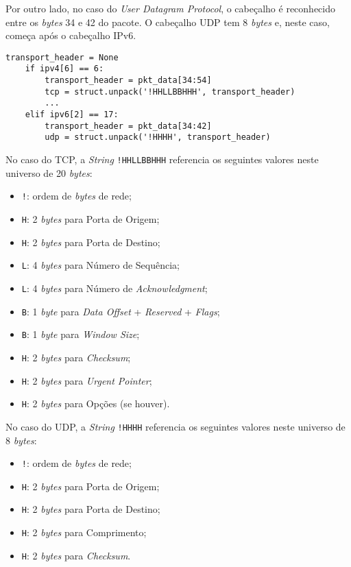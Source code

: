 \documentclass[12pt]{article}
\begin{document}
\quad Por outro lado, no caso do \emph{User Datagram Protocol}, o cabeçalho é reconhecido entre os \emph{bytes} 34 e 42 do pacote. O cabeçalho UDP tem 8 \emph{bytes} e, neste caso, começa após o cabeçalho IPv6.

\begin{lstlisting}[style=vscode]
transport_header = None
    if ipv4[6] == 6:
        transport_header = pkt_data[34:54]
        tcp = struct.unpack('!HHLLBBHHH', transport_header)
        ...
    elif ipv6[2] == 17:
        transport_header = pkt_data[34:42]
        udp = struct.unpack('!HHHH', transport_header)
\end{lstlisting}

\quad No caso do TCP, a \emph{String} \texttt{!HHLLBBHHH} referencia os seguintes valores neste universo de 20 \emph{bytes}:

\begin{itemize}
    \item \texttt{!}: ordem de \emph{bytes} de rede;
    \item \texttt{H}: 2 \emph{bytes} para Porta de Origem;
    \item \texttt{H}: 2 \emph{bytes} para Porta de Destino;
    \item \texttt{L}: 4 \emph{bytes} para Número de Sequência;
    \item \texttt{L}: 4 \emph{bytes} para Número de \emph{Acknowledgment};
    \item \texttt{B}: 1 \emph{byte} para \emph{Data Offset} + \emph{Reserved} + \emph{Flags};
    \item \texttt{B}: 1 \emph{byte} para \emph{Window Size};
    \item \texttt{H}: 2 \emph{bytes} para \emph{Checksum};
    \item \texttt{H}: 2 \emph{bytes} para \emph{Urgent Pointer};
    \item \texttt{H}: 2 \emph{bytes} para Opções (se houver).
\end{itemize}

\quad No caso do UDP, a \emph{String} \texttt{!HHHH} referencia os seguintes valores neste universo de 8 \emph{bytes}:

\begin{itemize}
    \item \texttt{!}: ordem de \emph{bytes} de rede;
    \item \texttt{H}: 2 \emph{bytes} para Porta de Origem;
    \item \texttt{H}: 2 \emph{bytes} para Porta de Destino;
    \item \texttt{H}: 2 \emph{bytes} para Comprimento;
    \item \texttt{H}: 2 \emph{bytes} para \emph{Checksum}.
\end{itemize}
\end{document}
